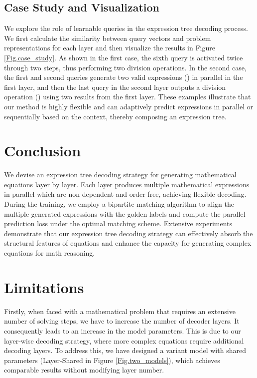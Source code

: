 \documentclass[11pt]{article}
\begin{document}
\subsection{Case Study and Visualization}
We explore the role of learnable queries in the expression tree decoding process. We first calculate the similarity between query vectors and problem representations for each layer and then visualize the results in Figure \ref{Fig.case_study}. As shown in the first case, the sixth query is activated twice through two steps, thus performing two division operations. In the second case, the first and second queries generate two valid expressions () in parallel in the first layer, and then the last query in the second layer outputs a division operation () using two results from the first layer. These examples illustrate that our method is highly flexible and can adaptively predict expressions in parallel or sequentially based on the context, thereby composing an expression tree.











\section{Conclusion}
We devise an expression tree decoding strategy for generating mathematical equations layer by layer. Each layer produces multiple mathematical expressions in parallel which are non-dependent and order-free, achieving flexible decoding. During the training, we employ a bipartite matching algorithm to align the multiple generated expressions with the golden labels and compute the parallel prediction loss under the optimal matching scheme. Extensive experiments demonstrate that our expression tree decoding strategy can effectively absorb the structural features of equations and enhance the capacity for generating complex equations for math reasoning.




\section*{Limitations}


Firstly, when faced with a mathematical problem that requires an extensive number of solving steps, we have to increase the number of decoder layers. It consequently leads to an increase in the model parameters. This is due to our layer-wise decoding strategy, where more complex equations require additional decoding layers. To address this, we have designed a variant model with shared parameters (Layer-Shared in Figure \ref{Fig.two_models}), which achieves comparable results without modifying layer number. 
\end{document}

